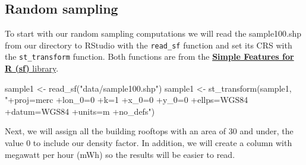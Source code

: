 \documentclass[
]{book}
\newenvironment{Shaded}{\begin{snugshade}}{\end{snugshade}}
\newcommand{\CommentTok}[1]{\textcolor[rgb]{0.56,0.35,0.01}{\textit{#1}}}
\newcommand{\DecValTok}[1]{\textcolor[rgb]{0.00,0.00,0.81}{#1}}
\newcommand{\FunctionTok}[1]{\textcolor[rgb]{0.00,0.00,0.00}{#1}}
\newcommand{\NormalTok}[1]{#1}
\newcommand{\OtherTok}[1]{\textcolor[rgb]{0.56,0.35,0.01}{#1}}
\newcommand{\SpecialCharTok}[1]{\textcolor[rgb]{0.00,0.00,0.00}{#1}}
\newcommand{\StringTok}[1]{\textcolor[rgb]{0.31,0.60,0.02}{#1}}
\begin{document}
\hypertarget{random-sampling}{%
\subsection{Random sampling}\label{random-sampling}}

To start with our random sampling computations we will read the sample100.shp from our directory to RStudio with the \texttt{read\_sf} function and set its CRS with the \texttt{st\_transform} function. Both functions are from the \href{https://r-spatial.github.io/sf/}{\textbf{Simple Features for R (sf)} library}.

\begin{Shaded}
\begin{Highlighting}[]
\NormalTok{sample1 }\OtherTok{\textless{}{-}} \FunctionTok{read\_sf}\NormalTok{(}\StringTok{"data/sample100.shp"}\NormalTok{)}
\NormalTok{sample1 }\OtherTok{\textless{}{-}} \FunctionTok{st\_transform}\NormalTok{(sample1, }\StringTok{"+proj=merc +lon\_0=0 +k=1 +x\_0=0 +y\_0=0 +ellps=WGS84 +datum=WGS84 +units=m +no\_defs"}\NormalTok{)}
\end{Highlighting}
\end{Shaded}

Next, we will assign all the building rooftops with an area of 30 and under, the value 0 to include our density factor. In addition, we will create a column with megawatt per hour (mWh) so the results will be easier to read.

\begin{Shaded}
\end{Shaded}
\end{document}
